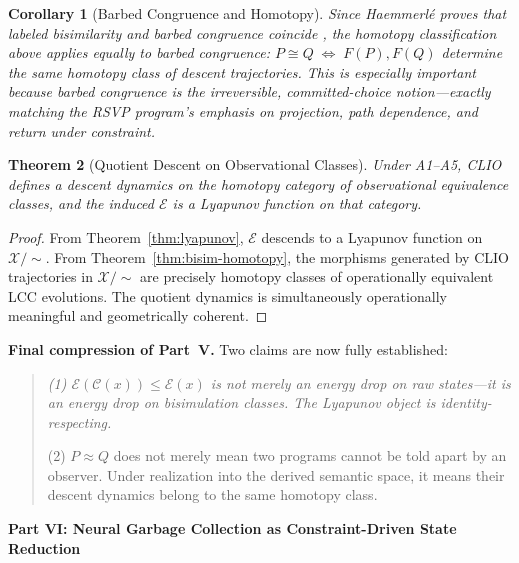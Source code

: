\documentclass[11pt, letterpaper]{article}
\theoremstyle{plain}
\newtheorem{theorem}{Theorem}[section]
\newtheorem{corollary}[theorem]{Corollary}
\theoremstyle{definition}
\theoremstyle{remark}
\newcommand{\CC}{\mathcal{C}}
\newcommand{\EE}{\mathcal{E}}
\begin{document}
\begin{corollary}[Barbed Congruence and Homotopy]
Since Haemmerl\'e proves that labeled bisimilarity and barbed congruence coincide
\cite{haemmerle2011}, the homotopy classification above applies equally to barbed
congruence:
$P \cong Q \;\Longleftrightarrow\; F(P), F(Q)$ determine the same homotopy class of
descent trajectories. This is especially important because barbed congruence is the
irreversible, committed-choice notion---exactly matching the RSVP program's emphasis on
projection, path dependence, and return under constraint.
\end{corollary}

\begin{theorem}[Quotient Descent on Observational Classes]
\label{thm:quotient-descent}
Under A1--A5, CLIO defines a descent dynamics on the homotopy category of
observational equivalence classes, and the induced $\EE$ is a Lyapunov function on
that category.
\end{theorem}

\begin{proof}
From Theorem~\ref{thm:lyapunov}, $\EE$ descends to a Lyapunov function on
$\mathcal{X}/{\sim}$. From Theorem~\ref{thm:bisim-homotopy}, the morphisms generated
by CLIO trajectories in $\mathcal{X}/{\sim}$ are precisely homotopy classes of
operationally equivalent LCC evolutions. The quotient dynamics is simultaneously
operationally meaningful and geometrically coherent.
\end{proof}

\noindent\textbf{Final compression of Part~V.} Two claims are now fully established:
\begin{quote}
\itshape
(1) $\EE(\CC(x)) \leq \EE(x)$ is not merely an energy drop on raw states---it is an
energy drop on bisimulation classes. The Lyapunov object is identity-respecting.

(2) $P \approx Q$ does not merely mean two programs cannot be told apart by an
observer. Under realization into the derived semantic space, it means their descent
dynamics belong to the same homotopy class.
\end{quote}


\vspace{1.2em}
\begin{center}{\large\bfseries Part VI: Neural Garbage Collection as Constraint-Driven State Reduction}\end{center}
\vspace{0.5em}
\end{document}
